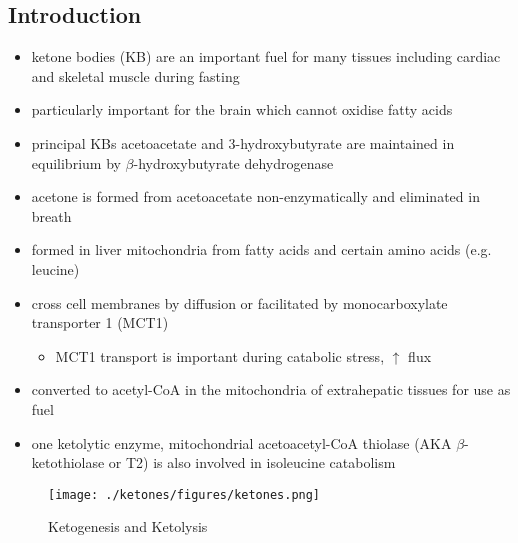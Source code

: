 \documentclass{scrartcl}
\begin{document}
\subsection{Introduction}
\label{sec:org7d2d9c2}
\begin{itemize}
\item ketone bodies (KB) are an important fuel for many tissues including
cardiac and skeletal muscle during fasting
\item particularly important for the brain which cannot oxidise fatty
acids
\item principal KBs acetoacetate and 3-hydroxybutyrate are maintained in
equilibrium by \(\beta\)-hydroxybutyrate dehydrogenase

\end{itemize}

\begin{center}
\setatomsep{1.8em}
\hspace{20}
\hspace{20}
\end{center}

\begin{itemize}
\item acetone is formed from acetoacetate non-enzymatically and eliminated in breath
\item formed in liver mitochondria from fatty acids and certain amino acids (e.g. leucine)
\item cross cell membranes by diffusion or facilitated by monocarboxylate transporter 1 (MCT1)
\begin{itemize}
\item MCT1 transport is important during catabolic stress, \(\uparrow\) flux
\end{itemize}
\item converted to acetyl-CoA in the mitochondria of extrahepatic tissues for use as fuel
\item one ketolytic enzyme, mitochondrial acetoacetyl-CoA thiolase (AKA
\(\beta\)-ketothiolase or T2) is also involved in isoleucine catabolism
\end{itemize}

\begin{figure}[htbp]
\centering
\texttt{[image: ./ketones/figures/ketones.png]}
\caption{\label{fig:orgf16cde0}
Ketogenesis and Ketolysis}
\end{figure}
\end{document}
